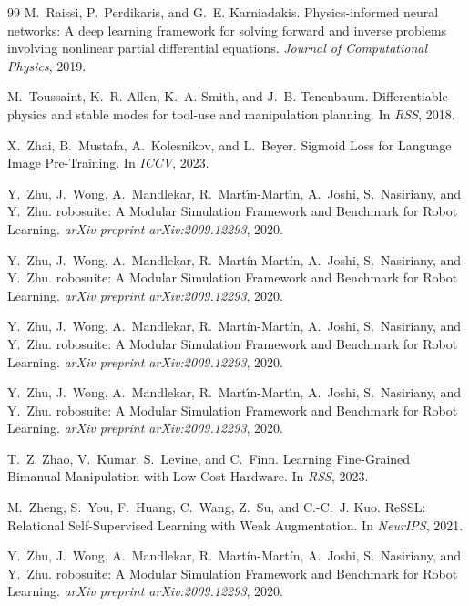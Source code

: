 \documentclass{article}
\begin{document}
\begin{thebibliography}{99}
M.~Raissi, P.~Perdikaris, and G.~E. Karniadakis.
\newblock Physics-informed neural networks: A deep learning framework for solving forward and inverse problems involving nonlinear partial differential equations.
\newblock \emph{Journal of Computational Physics}, 2019.

M.~Toussaint, K.~R. Allen, K.~A. Smith, and J.~B. Tenenbaum.
\newblock Differentiable physics and stable modes for tool-use and manipulation planning.
\newblock In \emph{RSS}, 2018.

X.~Zhai, B.~Mustafa, A.~Kolesnikov, and L.~Beyer.
\newblock Sigmoid Loss for Language Image Pre-Training.
\newblock In \emph{ICCV}, 2023.

Y.~Zhu, J.~Wong, A.~Mandlekar, R.~Mart{\'\i}n-Mart{\'\i}n, A.~Joshi, S.~Nasiriany, and Y.~Zhu.
\newblock robosuite: A Modular Simulation Framework and Benchmark for Robot Learning.
\newblock \emph{arXiv preprint arXiv:2009.12293}, 2020.

Y.~Zhu, J.~Wong, A.~Mandlekar, R.~Mart{\'i}n-Mart{\'i}n, A.~Joshi, S.~Nasiriany, and Y.~Zhu.
\newblock robosuite: A Modular Simulation Framework and Benchmark for Robot Learning.
\newblock \emph{arXiv preprint arXiv:2009.12293}, 2020.

Y.~Zhu, J.~Wong, A.~Mandlekar, R.~Mart{\'i}n-Mart{\'i}n, A.~Joshi, S.~Nasiriany, and Y.~Zhu.
\newblock robosuite: A Modular Simulation Framework and Benchmark for Robot Learning.
\newblock \emph{arXiv preprint arXiv:2009.12293}, 2020.

Y.~Zhu, J.~Wong, A.~Mandlekar, R.~Mart{\'\i}n-Mart{\'\i}n, A.~Joshi, S.~Nasiriany, and Y.~Zhu.
\newblock robosuite: A Modular Simulation Framework and Benchmark for Robot Learning.
\newblock \emph{arXiv preprint arXiv:2009.12293}, 2020.

T.~Z. Zhao, V.~Kumar, S.~Levine, and C.~Finn.
\newblock Learning Fine-Grained Bimanual Manipulation with Low-Cost Hardware.
\newblock In \emph{RSS}, 2023.

M.~Zheng, S.~You, F.~Huang, C.~Wang, Z.~Su, and C.-C.~J. Kuo.
\newblock ReSSL: Relational Self-Supervised Learning with Weak Augmentation.
\newblock In \emph{NeurIPS}, 2021.

Y.~Zhu, J.~Wong, A.~Mandlekar, R.~Mart{\'i}n-Mart{\'i}n, A.~Joshi, S.~Nasiriany, and Y.~Zhu.
\newblock robosuite: A Modular Simulation Framework and Benchmark for Robot Learning.
\newblock \emph{arXiv preprint arXiv:2009.12293}, 2020.

\end{thebibliography}
\end{document}
